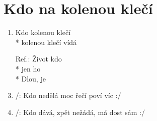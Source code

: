 \section{Kdo na kolenou klečí}
\begin{enumerate}
\item Kdo  kolenou klečí     \\*
  kolenou klečí vídá  
\item[Ref.:] Život   kdo  \\*
jen  ho  \\*
 Dlou,  je   
\item /: Kdo nedělá moc řečí poví víc :/
\item /: Kdo dává, zpět nežádá, má dost sám :/
\end{enumerate}

